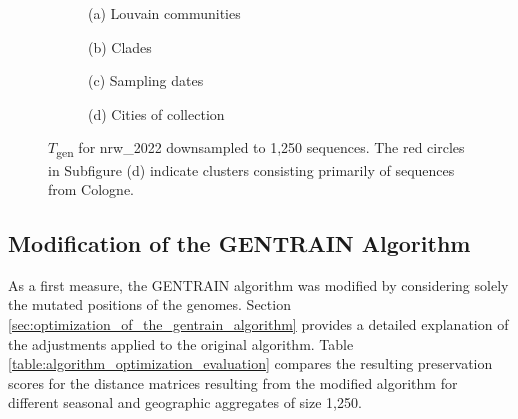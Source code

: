 \begin{figure}[H]
    \begin{subfigure}[b]{0.495\textwidth}
    
    \caption*{(a) Louvain communities}
  \end{subfigure}
    \begin{subfigure}[b]{0.495\textwidth}
    
    \caption*{(b) Clades}
  \end{subfigure}
  \par\vspace{1em} 
    \begin{subfigure}[b]{0.495\textwidth}
    
    \caption*{(c) Sampling dates}
  \end{subfigure}
  \begin{subfigure}[b]{0.495\textwidth}
    
    \caption*{(d) Cities of collection}
  \end{subfigure}
  \caption[$T$\textsubscript{gen} for nrw\_2022 downsampled to 1,250 sequences]{$T$\textsubscript{gen} for nrw\_2022 downsampled to 1,250 sequences. The red circles in Subfigure (d) indicate clusters consisting primarily of sequences from Cologne.}
  \label{fig:msts_nrw_2022}
\end{figure}

\subsection{Modification of the GENTRAIN Algorithm}
\label{sec:optimized_algorithm_results}
As a first measure, the GENTRAIN algorithm was modified by considering solely the mutated positions of the genomes. Section \ref{sec:optimization_of_the_gentrain_algorithm} provides a detailed explanation of the adjustments applied to the original algorithm. Table \ref{table:algorithm_optimization_evaluation} compares the resulting preservation scores for the distance matrices resulting from the modified algorithm for different seasonal and geographic aggregates of size 1,250. 

